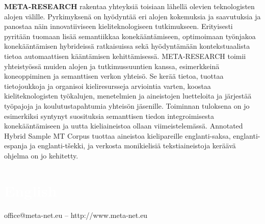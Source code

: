\begin{multicols}{2}
\textbf{META-RESEARCH} rakentaa yhteyksiä toisiaan lähellä olevien
teknologisten alojen välille. Pyrkimyksenä on hyödyntää eri alojen
kokemuksia ja saavutuksia ja panostaa näin innovatiiviseen kieliteknologiseen
tutkimukseen. Erityisesti pyritään tuomaan lisää semantiikkaa
konekääntämiseen, optimoimaan työnjakoa konekääntämisen hybrideissä
ratkaisuissa sekä hyödyntämään kontekstuaalista tietoa automaattisen
kääntämisen kehittämisessä. META-RESEARCH toimii yhteistyössä muiden
alojen ja tutkimussuuntien kanssa, esimerkkeinä koneoppiminen ja
semanttisen verkon yhteisö. Se kerää tietoa, tuottaa tietojoukkoja ja
organisoi kieliresursseja arviointia varten, koostaa
kieliteknologisten työkalujen, menetelmien ja aineistojen luetteloita
ja järjestää työpajoja ja koulutustapahtumia yhteisön
jäsenille. Toiminnan tuloksena on jo esimerkiksi syntynyt suosituksia
semanttisen tiedon integroimisesta konekääntämiseen ja uutta
kieliaineistoa ollaan viimeistelemässä. Annotated Hybrid Sample MT
Corpus tuottaa aineistoa kielipareille englanti-saksa,
englanti-espanja ja englanti-tšekki, ja verkosta monikielisiä
tekstiaineistoja keräävä ohjelma on jo kehitetty.
\end{multicols}

\vfill

\makeatletter
{}
{
  \renewcommand*{\theHsection}{\thepart.\thesection}
}
\makeatother
\part*{\textcolor{white}{English}}
\setcounter{section}{0}
\setcounter{figure}{0}

\centerline{office@meta-net.eu -- http://www.meta-net.eu}


\cleardoublepage


\clearpage


